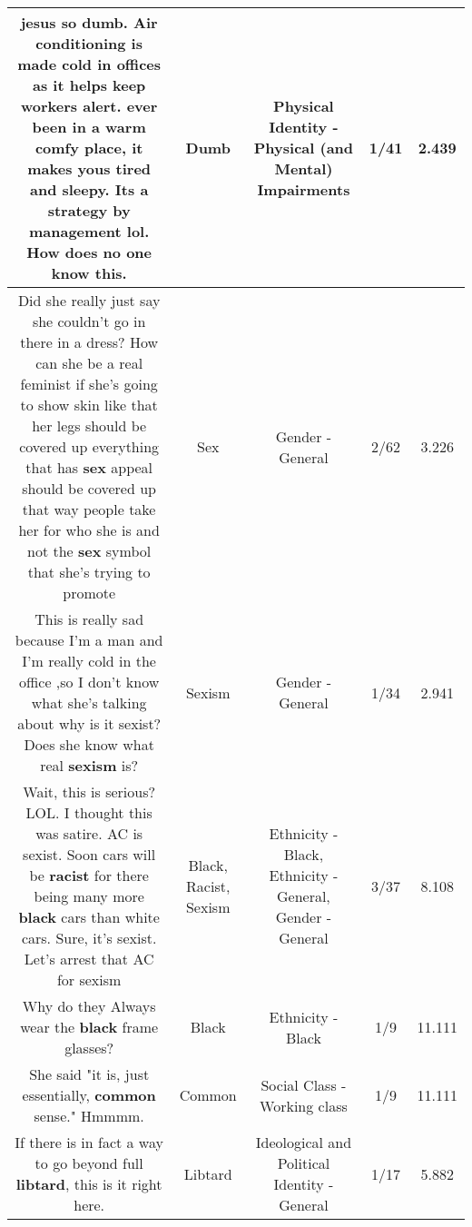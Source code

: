 \documentclass[11pt]{article}
\newlength\mylength
\begin{document}
\begin{center}
\begin{longtable}{|C{.65\mylength}|C{.30\mylength}|C{.12\mylength}|C{.12\mylength}|C{.12\mylength}|}
  \small jesus so \textbf{dumb}. Air conditioning is made cold in offices as it helps keep workers alert. ever been in a warm comfy place, it makes yous tired and sleepy. Its a strategy by management lol. How does no one know this.\normalsize   & Dumb & Physical Identity - Physical (and Mental) Impairments & 1/41 & 2.439 \\  \hline
  \small Did she really just say she couldn't go in there in a dress? How can she be a real feminist if she's going to show skin like that her legs should be covered up everything that has \textbf{sex} appeal should be covered up that way people take her for who she is and not the \textbf{sex} symbol that she's trying to promote\normalsize   & Sex & Gender - General & 2/62 & 3.226 \\  \hline
  \small This is really sad because I'm a man and I'm really cold in the office ,so I don't know what she's talking about why is it sexist? Does she know what real \textbf{sexism} is?\normalsize   & Sexism & Gender - General & 1/34 & 2.941 \\  \hline
  \small Wait, this is serious? LOL. I thought this was satire. AC is sexist. Soon cars will be \textbf{racist} for there being many more \textbf{black} cars than white cars. Sure, it's sexist. Let's arrest that AC for sexism\normalsize   & Black, Racist, Sexism & Ethnicity - Black, Ethnicity - General, Gender - General & 3/37 & 8.108 \\  \hline
  \small Why do they Always wear the \textbf{black} frame glasses?\normalsize   & Black & Ethnicity - Black & 1/9 & 11.111 \\  \hline
  \small She said "it is, just essentially, \textbf{common} sense." Hmmmm.\normalsize   & Common & Social Class - Working class & 1/9 & 11.111 \\  \hline
  \small If there is in fact a way to go beyond full \textbf{libtard}, this is it right here.\normalsize   & Libtard &  Ideological and Political Identity - General & 1/17 & 5.882 \\  \hline

\end{longtable}
\end{center}
\end{document}
